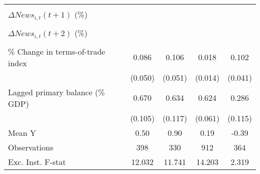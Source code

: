 {\begin{tabular}{l*{4}{c}}
                    &                     &                     &                     &                     \\
\addlinespace
$ \Delta News_{i,t}(t+1)$ (\%)&                     &                     &                     &                     \\
                    &                     &                     &                     &                     \\
\addlinespace
$ \Delta News_{i,t}(t+2)$ (\%)&                     &                     &                     &                     \\
                    &                     &                     &                     &                     \\
\addlinespace
\% Change in terms-of-trade index&       0.086\sym{*}  &       0.106\sym{**} &       0.018         &       0.102\sym{**} \\
                    &     (0.050)         &     (0.051)         &     (0.014)         &     (0.041)         \\
\addlinespace
Lagged primary balance (\% GDP)&       0.670\sym{***}&       0.634\sym{***}&       0.624\sym{***}&       0.286\sym{**} \\
                    &     (0.105)         &     (0.117)         &     (0.061)         &     (0.115)         \\
\midrule
Mean Y              &        0.50         &        0.90         &        0.19         &       -0.39         \\
Observations        &         398         &         330         &         912         &         364         \\
Exc. Inst. F-stat   &      12.032         &      11.741         &      14.203         &       2.319         \\
\bottomrule
\end{tabular}
}
